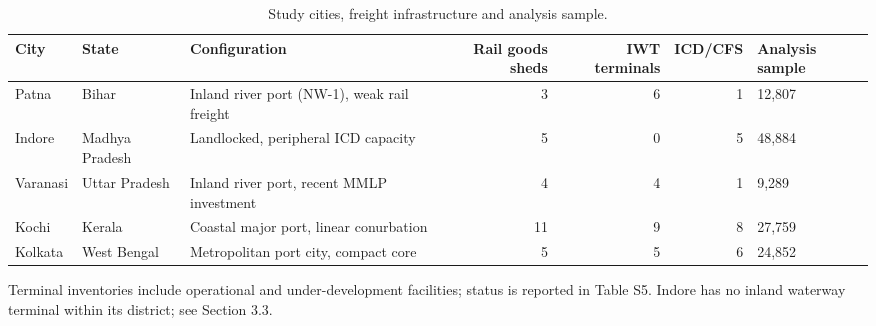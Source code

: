 \begin{table}[htbp]
\centering
\small
\caption{Study cities, freight infrastructure and analysis sample.}
\label{tab:t1_cities}
\begin{tabular}{lllrrrl}
\toprule
City & State & Configuration & Rail goods sheds & IWT terminals & ICD/CFS & Analysis sample \\
\midrule
Patna & Bihar & Inland river port (NW-1), weak rail freight & 3 & 6 & 1 & 12,807 \\
Indore & Madhya Pradesh & Landlocked, peripheral ICD capacity & 5 & 0 & 5 & 48,884 \\
Varanasi & Uttar Pradesh & Inland river port, recent MMLP investment & 4 & 4 & 1 & 9,289 \\
Kochi & Kerala & Coastal major port, linear conurbation & 11 & 9 & 8 & 27,759 \\
Kolkata & West Bengal & Metropolitan port city, compact core & 5 & 5 & 6 & 24,852 \\
\bottomrule
\end{tabular}
\begin{tablenotes}\footnotesize
\item Terminal inventories include operational and under-development facilities; status is reported in Table S5. Indore has no inland waterway terminal within its district; see Section 3.3.
\end{tablenotes}
\end{table}
